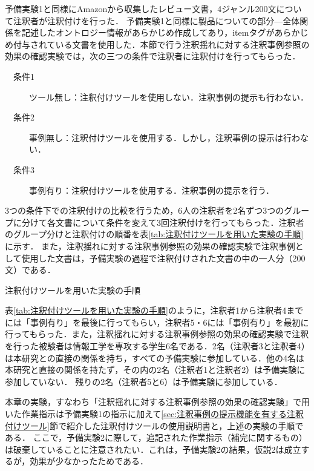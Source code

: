 \documentclass[japanese]{jnlp_1.4}
\begin{document}
予備実験1と同様にAmazonから収集したレビュー文書，4ジャンル200文について注釈者が注釈付けを行った．
予備実験1と同様に製品についての部分—全体関係を記述したオントロジー情報があらかじめ作成してあり，itemタグがあらかじめ付与されている文書を使用した．本節で行う注釈揺れに対する注釈事例参照の効果の確認実験では，次の三つの条件で注釈者に注釈付けを行ってもらった．


\begin{description}
\item[　条件1]
ツール無し：注釈付けツールを使用しない．注釈事例の提示も行わない．
\item[　条件2]
事例無し：注釈付けツールを使用する．しかし，注釈事例の提示は行わない．
\item[　条件3]
事例有り：注釈付けツールを使用する．注釈事例の提示を行う．
\end{description}

3つの条件下での注釈付けの比較を行うため，6人の注釈者を2名ずつ3つのグループに分けて各文書について条件を変えて3回注釈付けを行ってもらった．注釈者のグループ分けと注釈付けの順番を表\ref{tab:注釈付けツールを用いた実験の手順}に示す．
また，注釈揺れに対する注釈事例参照の効果の確認実験で注釈事例として使用した文書は，予備実験の過程で注釈付けされた文書の中の一人分（200文）である．

\begin{table}[b]
\caption{注釈付けツールを用いた実験の手順}
\label{tab:注釈付けツールを用いた実験の手順}

\end{table}

表\ref{tab:注釈付けツールを用いた実験の手順}のように，注釈者1から注釈者4までには「事例有り」を最後に行ってもらい，注釈者5・6には「事例有り」を最初に行ってもらった．また，注釈揺れに対する注釈事例参照の効果の確認実験で注釈を行った被験者は情報工学を専攻する学生6名である．2名（注釈者3と注釈者4）は本研究との直接の関係を持ち，すべての予備実験に参加している．他の4名は本研究と直接の関係を持たず，その内の2名（注釈者1と注釈者2）は予備実験に参加していない．
残りの2名（注釈者5と6）は予備実験に参加している．

本章の実験，すなわち「注釈揺れに対する注釈事例参照の効果の確認実験」で用いた作業指示は予備実験1の指示に加えて\ref{sec:注釈事例の提示機能を有する注釈付けツール}節で紹介した注釈付けツールの使用説明書と，上述の実験の手順である．
ここで，予備実験2に際して，追記された作業指示（補完に関するもの）は破棄していることに注意されたい．これは，予備実験2の結果，仮説2は成立するが，効果が少なかったためである．
\end{document}
